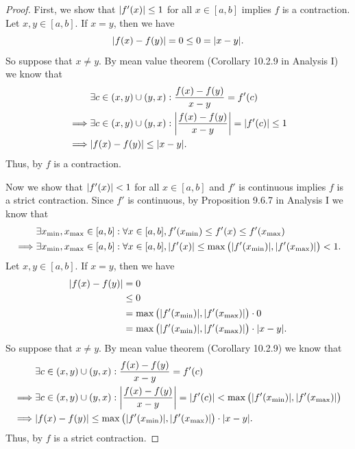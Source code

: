 \begin{proof}
  First, we show that \(\left\lvert f'(x)\right\rvert \leq 1\) for all \(x \in [a, b]\) implies \(f\) is a contraction.
  Let \(x, y \in [a, b]\).
  If \(x = y\), then we have
  \[
    \abs{f(x) - f(y)} = 0 \leq 0 = \abs{x - y}.
  \]
  So suppose that \(x \neq y\).
  By mean value theorem (Corollary 10.2.9 in Analysis I) we know that
  \begin{align*}
             & \exists c \in (x, y) \cup (y, x) : \dfrac{f(x) - f(y)}{x - y} = f'(c)                    \\
    \implies & \exists c \in (x, y) \cup (y, x) : \abs{\dfrac{f(x) - f(y)}{x - y}} = \abs{f'(c)} \leq 1 \\
    \implies & \abs{f(x) - f(y)} \leq \abs{x - y}.
  \end{align*}
  Thus, by  \(f\) is a contraction.

  Now we show that \(\left\lvert f'(x)\right\rvert < 1\) for all \(x \in [a, b]\) and \(f'\) is continuous implies \(f\) is a strict contraction.
  Since \(f'\) is continuous, by Proposition 9.6.7 in Analysis I we know that
  \begin{align*}
             & \exists x_{\min}, x_{\max} \in [a, b] : \forall x \in [a, b], f'(x_{\min}) \leq f'(x) \leq f'(x_{\max})                                  \\
    \implies & \exists x_{\min}, x_{\max} \in [a, b] : \forall x \in [a, b], \abs{f'(x)} \leq \max\big(\abs{f'(x_{\min})}, \abs{f'(x_{\max})}\big) < 1.
  \end{align*}
  Let \(x, y \in [a, b]\).
  If \(x = y\), then we have
  \begin{align*}
    \abs{f(x) - f(y)} & = 0                                                                       \\
                      & \leq 0                                                                    \\
                      & = \max\big(\abs{f'(x_{\min})}, \abs{f'(x_{\max})}\big) \cdot 0            \\
                      & = \max\big(\abs{f'(x_{\min})}, \abs{f'(x_{\max})}\big) \cdot \abs{x - y}.
  \end{align*}
  So suppose that \(x \neq y\).
  By mean value theorem (Corollary 10.2.9) we know that
  \begin{align*}
             & \exists c \in (x, y) \cup (y, x) : \dfrac{f(x) - f(y)}{x - y} = f'(c)                                                                    \\
    \implies & \exists c \in (x, y) \cup (y, x) : \abs{\dfrac{f(x) - f(y)}{x - y}} = \abs{f'(c)} < \max\big(\abs{f'(x_{\min})}, \abs{f'(x_{\max})}\big) \\
    \implies & \abs{f(x) - f(y)} \leq \max\big(\abs{f'(x_{\min})}, \abs{f'(x_{\max})}\big) \cdot \abs{x - y}.
  \end{align*}
  Thus, by  \(f\) is a strict contraction.
\end{proof}

